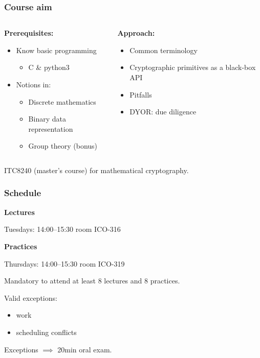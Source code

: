 \begin{frame}
  \frametitle{Course aim}

  \begin{columns}[T]
    \begin{column}{.4\textwidth}
      \textbf{Prerequisites:}
      \begin{itemize}[<+->]
        \pause
        \item Know basic programming
        \begin{itemize}
          \item C \& python3
        \end{itemize}
        \item Notions in:
        \begin{itemize}
          \item Discrete mathematics
          \item Binary data representation
          \item Group theory (bonus)
        \end{itemize}
      \end{itemize}
    \end{column}

    \pause
    \begin{column}{.4\textwidth}
      \textbf{Approach:}
      \begin{itemize}[<+->]
        \item Common terminology
        \item Cryptographic primitives as a black-box API
        \item Pitfalls
        \item DYOR: due diligence
      \end{itemize}
    \end{column}
  \end{columns}

  \vspace*{2em}

  \pause
  ITC8240 (master's course) for mathematical cryptography.
\end{frame}

\begin{frame}
  \frametitle{Schedule}

  \textbf{Lectures}

  Tuesdays: 14:00--15:30 room ICO-316

  \vspace*{1em}

  \pause
  \textbf{Practices}

  Thursdays: 14:00--15:30 room ICO-319

  \vspace*{1em}

  \pause
  Mandatory to attend at least 8 lectures and 8 practices.

  \pause
  Valid exceptions:
  \begin{itemize}
    \item work
    \item scheduling conflicts
  \end{itemize}

  \pause
  Exceptions $\implies$ 20min oral exam.
\end{frame}

